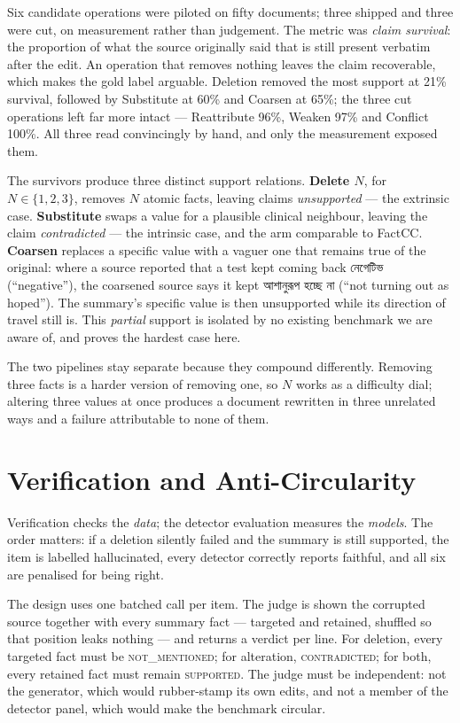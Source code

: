 \documentclass{iutbscthesis}
\newcommand{\bng}[1]{{\bn #1}}
\begin{document}
Six candidate operations were piloted on fifty documents; three shipped and three were cut, on measurement rather than judgement. The metric was \emph{claim survival}: the proportion of what the source originally said that is still present verbatim after the edit. An operation that removes nothing leaves the claim recoverable, which makes the gold label arguable. Deletion removed the most support at 21\% survival, followed by Substitute at 60\% and Coarsen at 65\%; the three cut operations left far more intact --- Reattribute 96\%, Weaken 97\% and Conflict 100\%. All three read convincingly by hand, and only the measurement exposed them.

The survivors produce three distinct support relations. \textbf{Delete $N$}, for $N \in \{1,2,3\}$, removes $N$ atomic facts, leaving claims \emph{unsupported} --- the extrinsic case. \textbf{Substitute} swaps a value for a plausible clinical neighbour, leaving the claim \emph{contradicted} --- the intrinsic case, and the arm comparable to FactCC. \textbf{Coarsen} replaces a specific value with a vaguer one that remains true of the original: where a source reported that a test kept coming back \bng{নেগেটিভ} (``negative''), the coarsened source says it kept \bng{আশানুরূপ হচ্ছে না} (``not turning out as hoped''). The summary's specific value is then unsupported while its direction of travel still is. This \emph{partial} support is isolated by no existing benchmark we are aware of, and proves the hardest case here.

The two pipelines stay separate because they compound differently. Removing three facts is a harder version of removing one, so $N$ works as a difficulty dial; altering three values at once produces a document rewritten in three unrelated ways and a failure attributable to none of them.

\section{Verification and Anti-Circularity}

Verification checks the \emph{data}; the detector evaluation measures the \emph{models}. The order matters: if a deletion silently failed and the summary is still supported, the item is labelled hallucinated, every detector correctly reports faithful, and all six are penalised for being right.

The design uses one batched call per item. The judge is shown the corrupted source together with every summary fact --- targeted and retained, shuffled so that position leaks nothing --- and returns a verdict per line. For deletion, every targeted fact must be \textsc{not\_mentioned}; for alteration, \textsc{contradicted}; for both, every retained fact must remain \textsc{supported}. The judge must be independent: not the generator, which would rubber-stamp its own edits, and not a member of the detector panel, which would make the benchmark circular.
\end{document}
